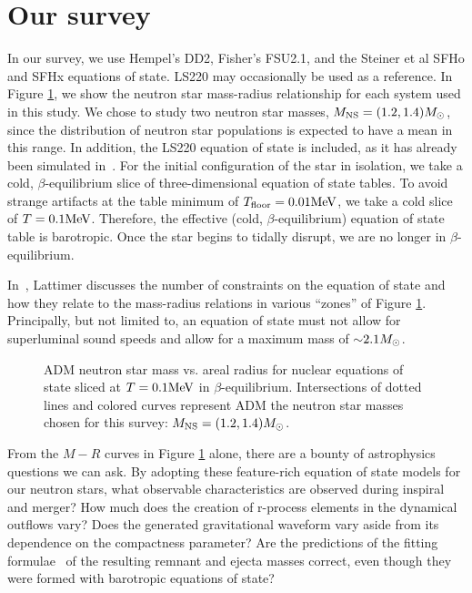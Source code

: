 \section{Our survey}

In our survey, we use Hempel's DD2, Fisher's FSU2.1, and the Steiner et al SFHo and SFHx equations of state.  
LS220 may occasionally be used as a reference. 
In Figure \ref{fig:MvsR}, we show the neutron star mass-radius relationship for each system used in this study. 
We chose to study two neutron star masses, $M_{\rm NS} = (1.2, 1.4) M_{\odot}$, since the distribution of neutron star populations is expected to have a mean in this range. 
In addition, the LS220 equation of state is included, as it has already been simulated in~\cite{Foucart:2014nda}.  
For the initial configuration of the star in isolation, we take a cold, $\beta$-equilibrium slice of three-dimensional equation of state tables.  
To avoid strange artifacts at the table minimum of $T_{\rm floor} = 0.01 {\rm MeV}$, we take a cold slice of  $T = 0.1 {\rm MeV}$.  Therefore, the effective (cold, $\beta$-equilibrium) equation of state table is barotropic. Once the star begins to tidally disrupt, we are no longer in $\beta$-equilibrium.

In~\cite{lattimer2016equation}, Lattimer discusses the number of constraints on the equation of state and how they relate to the mass-radius relations in various ``zones'' of Figure \ref{fig:MvsR}.  
Principally, but not limited to, an equation of state must not allow for superluminal sound speeds and allow for a maximum mass of $\mathord{\sim} 2.1 M_{\odot}$.

\begin{figure}
	\centering
	
	\caption[Neutron star mass vs. areal radius]{
		ADM neutron star mass vs. areal radius for nuclear equations of state sliced at $T=0.1{\rm MeV}$ in $\beta$-equilibrium.  Intersections of dotted lines and colored curves represent ADM the neutron star masses chosen for this survey: $M_{\rm NS} = (1.2, 1.4) M_{\odot}$.  
	}
	\label{fig:MvsR}
\end{figure}

From the $M-R$ curves in Figure \ref{fig:MvsR} alone, there are a bounty of astrophysics questions we can ask.  
By adopting these feature-rich equation of state models for our neutron stars, what observable characteristics are observed during inspiral and merger?  
How much does the creation of r-process elements in the dynamical outflows vary?  
Does the generated gravitational waveform vary aside from its dependence on the compactness parameter?  
Are the predictions of the fitting formulae~\cite{foucart2012black,pannarale2014black,kawaguchi2016models} of the resulting remnant and ejecta masses correct, even though they were formed with barotropic equations of state?

